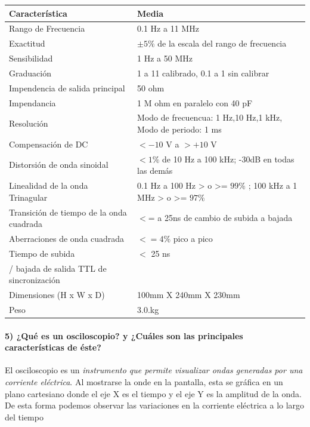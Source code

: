 \begin{tabular}{|l|l|}
	\hline
	
	Característica &  Media \\
	\hline
	 Rango de Frecuencia &  0.1 Hz a 11 MHz \\
	\hline
	 Exactitud & $\pm 5\%$  de la escala del rango de frecuencia \\
	\hline
	Sensibilidad &   1 Hz a 50 MHz \\
	\hline
	Graduación & 1 a 11 calibrado, 0.1 a 1 sin calibrar  \\
	\hline
	Impendencia de salida principal &  50 ohm \\
	\hline
	Impendancia &  1 M ohm en paralelo con 40 pF \\
	\hline
	Resolución & Modo de frecuencua: 1 Hz,10 Hz,1 kHz, Modo de periodo: 1 ms  \\
	\hline
	Compensación de DC  &  $<-10$ V a $>+ 10$ V  \\
	\hline
	Distorsión de onda sinoidal & $<1\%$ de 10 Hz a 100 kHz; -30dB en todas las demás  \\
	\hline
	Linealidad de la onda Trinagular &  0.1 Hz a 100 Hz > o >= $99\%$ ; 100 kHz a 1 MHz > o >= $97\%$ \\
	\hline
	Transición de tiempo de la onda cuadrada & $<$= a 25ns de cambio de subida a bajada  \\
	\hline
	Aberraciones de onda cuadrada & $<= 4\%$ pico a pico  \\
	\hline
	Tiempo de subida & $<$ 25 ns  \\ / bajada de salida TTL de sincronización &  \\
	\hline
	Dimensiones (H x W x D) & 100mm X 240mm X 230mm \\
	\hline
	Peso & 3.0.kg \\
	\hline
\end{tabular}



\newpage

\paragraph{5) ¿Qué es un osciloscopio? y ¿Cuáles son las principales características de éste?}

El osciloscopio es un \textit{instrumento que permite visualizar ondas generadas por una corriente eléctrica}. Al mostrarse la onde en la pantalla, esta se gráfica en un plano cartesiano donde el eje X es el tiempo y el eje Y es la amplitud de la onda. De esta forma podemos observar las variaciones en la corriente eléctrica a lo largo del tiempo


